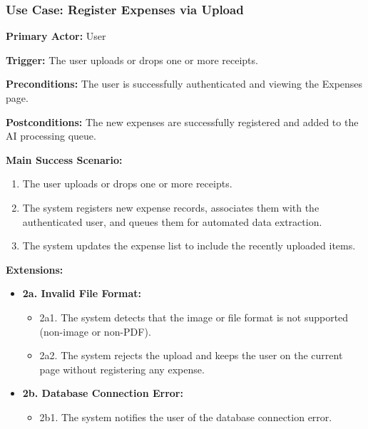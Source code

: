 \subsubsection{\textbf{Use Case: Register Expenses via Upload}}

\textbf{Primary Actor:} User

\textbf{Trigger:} The user uploads or drops one or more receipts.

\textbf{Preconditions:} The user is successfully authenticated and viewing the Expenses page.

\textbf{Postconditions:} The new expenses are successfully registered and added to the AI processing queue.

\vspace{0.5cm}

\textbf{Main Success Scenario:}

\begin{enumerate} [leftmargin=0.75cm, noitemsep]
    \item The user uploads or drops one or more receipts.
    \item The system registers new expense records, associates them with the authenticated user, and queues them for automated data extraction.
    \item The system updates the expense list to include the recently uploaded items.
\end{enumerate}

\vspace{0.3cm}

\textbf{Extensions:}

\begin{itemize} [label={}, leftmargin=0.75cm, noitemsep]
    \item \textbf{2a. Invalid File Format:}
    \begin{itemize} [label={}, leftmargin=0.75cm, noitemsep]
        \item 2a1. The system detects that the image or file format is not supported (non-image or non-PDF).
        \item 2a2. The system rejects the upload and keeps the user on the current page without registering any expense.
    \end{itemize}

    \item \textbf{2b. Database Connection Error:}
    \begin{itemize} [label={}, leftmargin=0.75cm, noitemsep]
        \item 2b1. The system notifies the user of the database connection error.
    \end{itemize}
\end{itemize}
